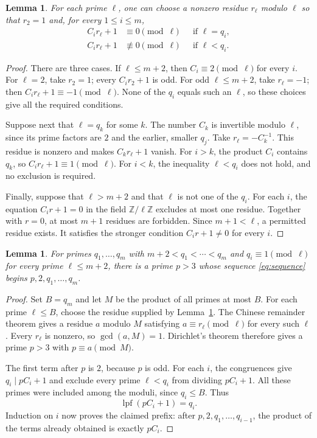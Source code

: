 \documentclass[11pt]{article}
\newtheorem{lemma}[theorem]{Lemma}
\newcommand{\lpf}{\operatorname{lpf}}
\begin{document}
\begin{lemma}\label{lem:local}
For each prime $\ell$, one can choose a nonzero residue $r_\ell$
modulo $\ell$ so that $r_2=1$ and, for every $1\leq i\leq m$,
\begin{align*}
 C_i r_\ell+1&\equiv0\pmod\ell &&\text{if }\ell=q_i,\\
 C_i r_\ell+1&\not\equiv0\pmod\ell &&\text{if }\ell<q_i.
\end{align*}
\end{lemma}

\begin{proof}
There are three cases. If $\ell\leq m+2$, then $C_i\equiv2\pmod\ell$
for every $i$. For $\ell=2$, take $r_2=1$; every $C_i r_2+1$ is odd.
For odd $\ell\leq m+2$, take $r_\ell=-1$; then
$C_i r_\ell+1\equiv-1\pmod\ell$. None of the $q_i$ equals such an
$\ell$, so these choices give all the required conditions.

Suppose next that $\ell=q_k$ for some $k$. The number $C_k$ is
invertible modulo $\ell$, since its prime factors are $2$ and the
earlier, smaller $q_j$. Take $r_\ell=-C_k^{-1}$.
This residue is nonzero and makes $C_k r_\ell+1$ vanish.
For $i>k$, the product $C_i$ contains $q_k$, so
$C_i r_\ell+1\equiv1\pmod\ell$. For $i<k$, the inequality
$\ell<q_i$ does not hold, and no exclusion is required.

Finally, suppose that $\ell>m+2$ and that $\ell$ is not one of the
$q_i$. For each $i$, the equation $C_i r+1=0$ in the field
$\mathbb Z/\ell\mathbb Z$ excludes at most one residue. Together with $r=0$, at most $m+1$ residues are forbidden.
Since $m+1<\ell$, a permitted residue exists. It satisfies the
stronger condition $C_i r+1\ne0$ for every $i$.
\end{proof}

\begin{lemma}\label{lem:lift}
For primes $q_1,\ldots,q_m$ with $m+2<q_1<\cdots<q_m$ and
$q_i\equiv1\pmod\ell$ for every prime $\ell\leq m+2$, there is a prime $p>3$ whose sequence
\eqref{eq:sequence} begins $p,2,q_1,\ldots,q_m$.
\end{lemma}

\begin{proof}
Set $B=q_m$ and let $M$ be the product of all primes at most
$B$. For each prime $\ell\leq B$, choose the residue supplied by
Lemma~\ref{lem:local}. The Chinese remainder theorem gives a residue
$a$ modulo $M$ satisfying $a\equiv r_\ell\pmod\ell$ for every such
$\ell$. Every $r_\ell$ is nonzero, so $\gcd(a,M)=1$.
Dirichlet's theorem therefore gives a prime $p>3$ with
$p\equiv a\pmod M$.

The first term after $p$ is $2$, because $p$ is odd. For each $i$,
the congruences give $q_i\mid pC_i+1$ and exclude every prime
$\ell<q_i$ from dividing $pC_i+1$. All these primes were included
among the moduli, since $q_i\leq B$. Thus
\[
 \lpf(pC_i+1)=q_i.
\]
Induction on $i$ now proves the claimed prefix: after $p,2,q_1,\ldots,q_{i-1}$,
the product of the terms already obtained is exactly $pC_i$.
\end{proof}
\end{document}
